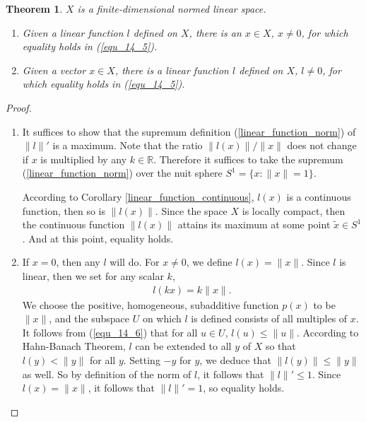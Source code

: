 \documentclass[11pt]{book}
\newtheorem{theorem}{Theorem}[section]
\theoremstyle{definition}
\numberwithin{equation}{chapter}
\begin{document}
\medskip

\begin{theorem}\label{equality_hold_theorem}
$X$ is a finite-dimensional normed linear space.
\begin{enumerate}[label=(\alph*)]
    \item Given a linear function $l$ defined on $X$, there is an $x \in X$, $x \neq 0$, for which equality holds in (\ref{equ_14_5}).
    
    \item Given a vector $x \in X$, there is a linear function $l$ defined on $X$, $l \neq 0$, for which equality holds in (\ref{equ_14_5}).
\end{enumerate}
\end{theorem}
\begin{proof}
~\begin{enumerate}[label=(\alph*)]
    \item It suffices to show that the supremum definition (\ref{linear_function_norm}) of $\|l\|'$ is a maximum. Note that the ratio $\|l(x)\|/\|x\|$ does not change if $x$ is multiplied by any $k \in \mathbb{R}$. Therefore it suffices to take the supremum (\ref{linear_function_norm}) over the nuit sphere $S^1 = \{x: \|x\| = 1\}$.
    
    According to Corollary \ref{linear_function_continuous}, $l(x)$ is a continuous function, then so is $\|l(x)\|$. Since the space $X$ is locally compact, then the continuous function $\|l(x)\|$ attains its maximum at some point $\widetilde{x} \in S^1$. And at this point, equality holds.
    
    \item If $x = 0$, then any $l$ will do. For $x \neq 0$, we define $l(x) = \|x\|$. Since $l$ is linear, then we set for any scalar $k$, 
    \begin{align}\label{equ_14_6}
        l(kx) = k \|x\|.
    \end{align}
    We choose the positive, homogeneous, subadditive function $p(x)$ to be $\|x\|$, and the subspace $U$ on which $l$ is defined consists of all multiples of $x$. It follows from (\ref{equ_14_6}) that for all $u \in U$, $l(u) \leq \|u\|$. According to Hahn-Banach Theorem, $l$ can be extended to all $y$ of $X$ so that $l(y) < \|y\|$ for all $y$.  Setting $-y$ for $y$, we deduce that $\|l(y)\| \leq \|y\|$ as well. So by definition of the norm of $l$, it follows that $\|l\|' \leq 1$. Since $l(x) = \|x\|$, it follows that $\|l\|' = 1$, so equality holds.
\end{enumerate}
\end{proof}
\end{document}
